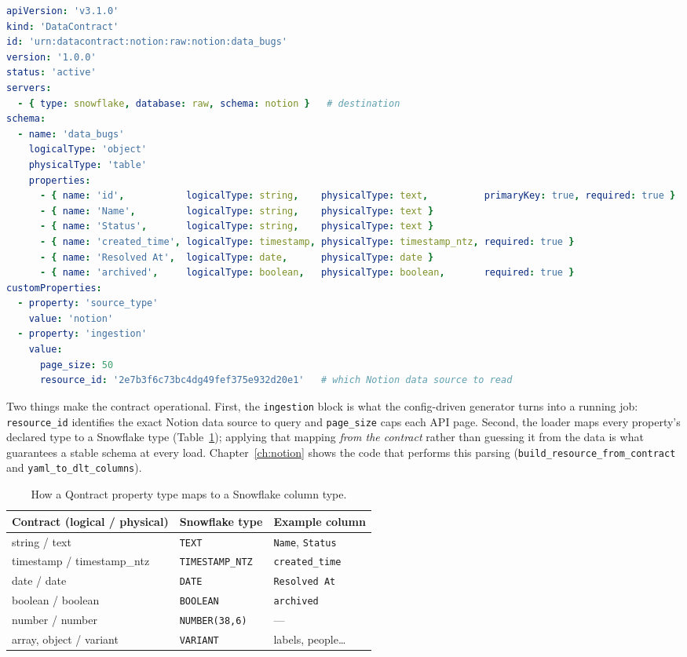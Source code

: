 \begin{lstlisting}[language=yaml,caption={A contract example for the Notion data\_bugs table.},label={lst:qontract}]
apiVersion: 'v3.1.0'
kind: 'DataContract'
id: 'urn:datacontract:notion:raw:notion:data_bugs'
version: '1.0.0'
status: 'active'
servers:
  - { type: snowflake, database: raw, schema: notion }   # destination
schema:
  - name: 'data_bugs'
    logicalType: 'object'
    physicalType: 'table'
    properties:
      - { name: 'id',           logicalType: string,    physicalType: text,          primaryKey: true, required: true }
      - { name: 'Name',         logicalType: string,    physicalType: text }
      - { name: 'Status',       logicalType: string,    physicalType: text }
      - { name: 'created_time', logicalType: timestamp, physicalType: timestamp_ntz, required: true }
      - { name: 'Resolved At',  logicalType: date,      physicalType: date }
      - { name: 'archived',     logicalType: boolean,   physicalType: boolean,       required: true }
customProperties:
  - property: 'source_type'
    value: 'notion'
  - property: 'ingestion'
    value:
      page_size: 50
      resource_id: '2e7b3f6c73bc4dg49fef375e932d20e1'   # which Notion data source to read
\end{lstlisting}

Two things make the contract operational. First, the \texttt{ingestion} block is what the config-driven generator turns into a running job: \texttt{resource\_id} identifies the exact Notion data source to query and \texttt{page\_size} caps each API page. Second, the loader maps every property's declared type to a Snowflake type (Table~\ref{tab:type-map}); applying that mapping \emph{from the contract} rather than guessing it from the data is what guarantees a stable schema at every load. Chapter~\ref{ch:notion} shows the code that performs this parsing (\texttt{build\_resource\_from\_contract} and \texttt{yaml\_to\_dlt\_columns}).

\begin{table}[H]
\centering\small
\begin{tabular}{@{}lll@{}}
\toprule
\textbf{Contract} (logical / physical) & \textbf{Snowflake type} & \textbf{Example column} \\
\midrule
string / text & \texttt{TEXT} & \texttt{Name}, \texttt{Status} \\
timestamp / timestamp\_ntz & \texttt{TIMESTAMP\_NTZ} & \texttt{created\_time} \\
date / date & \texttt{DATE} & \texttt{Resolved At} \\
boolean / boolean & \texttt{BOOLEAN} & \texttt{archived} \\
number / number & \texttt{NUMBER(38,6)} & --- \\
array, object / variant & \texttt{VARIANT} & labels, people\dots \\
\bottomrule
\end{tabular}
\caption{How a Qontract property type maps to a Snowflake column type.}
\label{tab:type-map}
\end{table}

